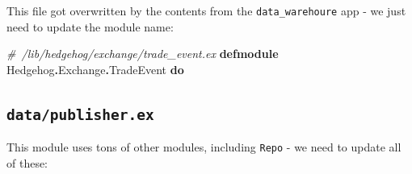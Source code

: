 \documentclass[
  oneside]{book}
\newenvironment{Shaded}{\begin{snugshade}}{\end{snugshade}}
\newcommand{\CommentTok}[1]{\textcolor[rgb]{0.56,0.35,0.01}{\textit{#1}}}
\newcommand{\ConstantTok}[1]{\textcolor[rgb]{0.56,0.35,0.01}{#1}}
\newcommand{\KeywordTok}[1]{\textcolor[rgb]{0.13,0.29,0.53}{\textbf{#1}}}
\newcommand{\OperatorTok}[1]{\textcolor[rgb]{0.81,0.36,0.00}{\textbf{#1}}}
\begin{document}
This file got overwritten by the contents from the \texttt{data\_warehoure} app - we just need to update the module name:

\begin{Shaded}
\begin{Highlighting}[]
\CommentTok{\# /lib/hedgehog/exchange/trade\_event.ex}
\KeywordTok{defmodule} \ConstantTok{Hedgehog}\OperatorTok{.}\ConstantTok{Exchange}\OperatorTok{.}\ConstantTok{TradeEvent} \KeywordTok{do}
\end{Highlighting}
\end{Shaded}

\subsection{\texorpdfstring{\texttt{data/publisher.ex}}{data/publisher.ex}}\label{datapublisher.ex}

This module uses tons of other modules, including \texttt{Repo} - we need to update all of these:
\end{document}
